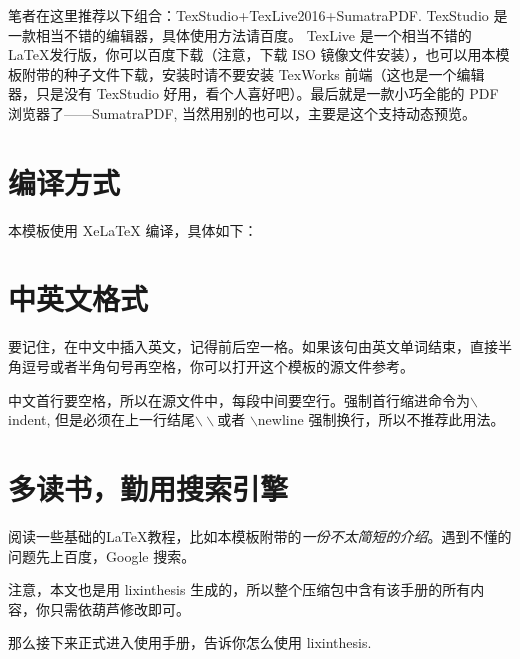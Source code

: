 笔者在这里推荐以下组合：TexStudio+TexLive2016+SumatraPDF. TexStudio 是一款相当不错的编辑器，具体使用方法请百度。 TexLive 是一个相当不错的 \LaTeX 发行版，你可以百度下载（注意，下载 ISO 镜像文件安装），也可以用本模板附带的种子文件下载，安装时请不要安装 TexWorks 前端（这也是一个编辑器，只是没有 TexStudio 好用，看个人喜好吧）。最后就是一款小巧全能的 PDF 浏览器了——SumatraPDF, 当然用别的也可以，主要是这个支持动态预览。

\section{编译方式}
本模板使用 XeLaTeX 编译，具体如下：

\section{中英文格式}
要记住，在中文中插入英文，记得前后空一格。如果该句由英文单词结束，直接半角逗号或者半角句号再空格，你可以打开这个模板的源文件参考。

中文首行要空格，所以在源文件中，每段中间要空行。强制首行缩进命令为$\backslash$indent, 但是必须在上一行结尾$\backslash\backslash$或者 $\backslash$newline 强制换行，所以不推荐此用法。

\section{多读书，勤用搜索引擎}
阅读一些基础的\LaTeX 教程，比如本模板附带的\emph{一份不太简短的\LaTeXe 介绍}。遇到不懂的问题先上百度，Google 搜索。

注意，本文也是用 lixinthesis 生成的，所以整个压缩包中含有该手册的所有内容，你只需依葫芦修改即可。

那么接下来正式进入使用手册，告诉你怎么使用 lixinthesis. 